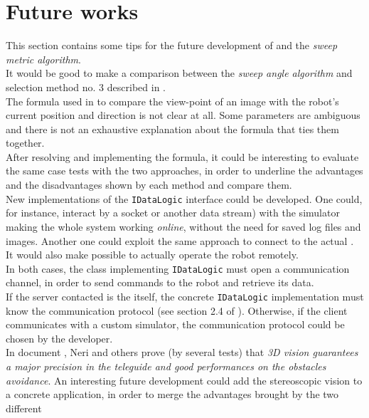 \setcounter{figure}{0}
\setcounter{table}{0}
\setcounter{lstlisting}{0}

\chapter{Future works}
\label{future_works}
\minitoc

This section contains some tips for the future development of 
\framework{} and the \textit{sweep metric algorithm}.
\\
It would be good to make a comparison between the \textit{sweep angle
algorithm} and selection method no. 3 described in \cite{sugimoto}.
\\
The formula used in \cite{sugimoto} to compare the view-point of an image with
the robot's current position and direction is not clear at all. Some parameters
are ambiguous and there is not an exhaustive explanation about the formula that
ties them together.
\\
After resolving and implementing the formula, it could be interesting to evaluate
the same case tests with the two approaches, in order to underline the advantages
and the disadvantages shown by each method and compare them.
\\
New implementations of the \texttt{IDataLogic} interface could be 
developed. One could, for instance, interact by a socket or another 
data stream) with the simulator making the whole system working \textit{online}, 
without the need for saved log files and images. Another one could exploit the 
same approach to connect to the actual \morduc{}. It would also make possible 
to actually operate the robot remotely.
\\
In both cases, the class implementing \texttt{IDataLogic} must open a communication
channel, in order to send commands to the robot and retrieve its data.
\\
If the server contacted is the \morduc{} itself, the concrete \texttt{IDataLogic} 
implementation must know the \morduc{} communication protocol (see section 2.4 of 
\cite{morduc:dasero}). Otherwise, if the client communicates with a custom 
simulator, the communication protocol could be chosen by the developer.
\\
In document \cite{morduc:neri}, Neri and others prove (by several tests) that \textit{3D
vision guarantees a major precision in the teleguide and good performances on the obstacles
avoidance}. An interesting future development could add the stereoscopic vision to a concrete
\framework{} application, in order to merge the advantages brought by the two different

